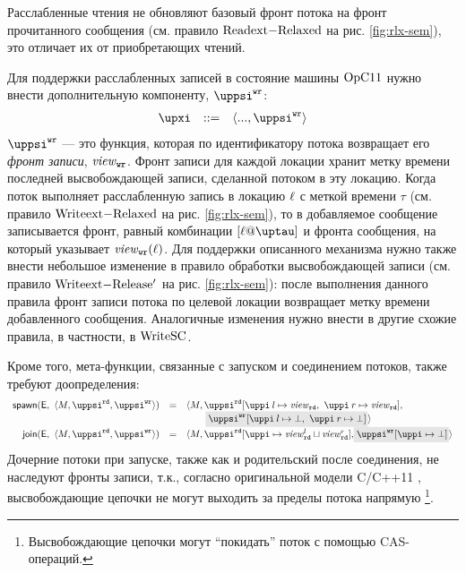 Расслабленные чтения не обновляют базовый фронт потока на фронт прочитанного сообщения
(см. правило ${\rm Read	ext{-}Relaxed}$ на рис. \ref{fig:rlx-sem}), это отличает их от
приобретающих чтений.

Для поддержки расслабленных записей в состояние машины $\mathrm{OpC11}$ нужно внести дополнительную компоненту, $\stPsiWrite$:
%
\[\begin{array}{rcl}
\auxX      & ::= & \angled{..., \stPsiWrite}
\end{array}\]
%
$\stPsiWrite$ --- это функция, которая по идентификатору потока возвращает его \emph{фронт записи}, $\mathit{view}_{\text{\scriptsize{\texttt{wr}}}}$.
Фронт записи для каждой локации хранит метку времени последней высвобождающей записи, сделанной потоком в эту локацию.
Когда поток выполняет расслабленную запись в локацию $\ell$ с меткой времени $\tau$
(см. правило ${\rm Write	ext{-}Relaxed}$ на рис. \ref{fig:rlx-sem}),
то в добавляемое сообщение записывается фронт, равный комбинации $[\loc@\tau]$ и фронта сообщения, на который указывает
$\mathit{view}_{\text{\scriptsize{\texttt{wr}}}}(\ell)$.
Для поддержки описанного механизма нужно также внести небольшое изменение в правило обработки высвобождающей записи
(см. правило ${\rm Write	ext{-}Release'}$ на рис. \ref{fig:rlx-sem}): после выполнения данного правила фронт записи потока
по целевой локации возвращает метку времени добавленного сообщения. Аналогичные изменения нужно внести в другие
схожие правила, в частности, в ${\rm WriteSC}$.

Кроме того, мета-функции, связанные с запуском и соединением потоков, также требуют доопределения:
\[
\begin{array}{r c l}
\spawn{\EvalContext}{\angled{\stEta,\stPsiRead,\stPsiWrite}} & = &
\angled{\stEta,
\stPsiRead[\stpath\:l \mapsto \stSigmaRead,~\stpath\:r \mapsto \stSigmaRead], \\
& & \quad ~~~ \graybox{\stPsiWrite[\stpath\:l \mapsto \bot,~\stpath\:r \mapsto \bot]}} \\

\joinP{\EvalContext}{\angled{\stEta, \stPsiRead, \stPsiWrite}} & = &
\angled{\stEta, \stPsiRead[\stpath \mapsto \stSigmaRead^{l} \sqcup \stSigmaRead^{r}],
  \graybox{\stPsiWrite[\stpath \mapsto \bot]}}
\end{array}
\]
Дочерние потоки при запуске, также как и родительский после соединения, не наследуют
фронты записи, т.к., согласно оригинальной модели C/C++11 \cite{Batty-al:POPL11},
высвобождающие цепочки не могут выходить за пределы потока напрямую%
\footnote{Высвобождающие цепочки могут ``покидать'' поток с помощью CAS-операций.}.

